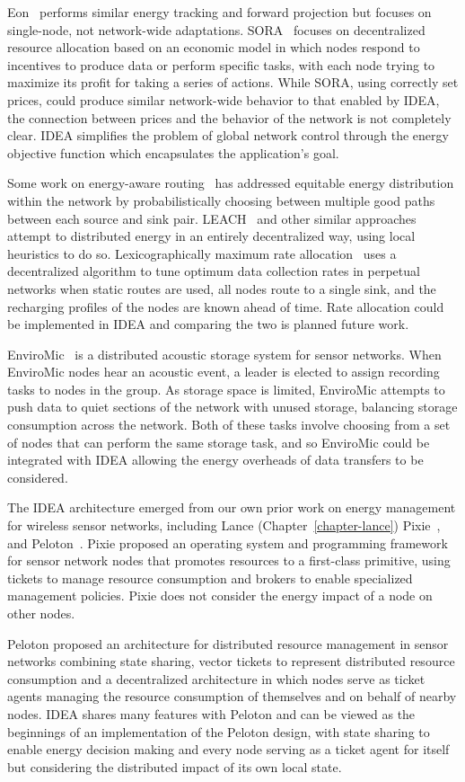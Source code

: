 Eon~\cite{eon-sensys07} performs similar energy tracking and forward
projection but focuses on single-node, not network-wide adaptations.
SORA~\cite{sora-nsdi05} focuses on decentralized resource allocation based on
an economic model in which nodes respond to incentives to produce data or
perform specific tasks, with each node trying to maximize its profit for
taking a series of actions. While SORA, using correctly set prices, could
produce similar network-wide behavior to that enabled by IDEA, the connection
between prices and the behavior of the network is not completely clear. IDEA
simplifies the problem of global network control through the energy objective
function which encapsulates the application's goal.

Some work on energy-aware routing~\cite{ShahRabaey2002,381685} has addressed
equitable energy distribution within the network by probabilistically
choosing between multiple good paths between each source and sink pair.
LEACH~\cite{leach} and other similar approaches attempt to distributed energy
in an entirely decentralized way, using local heuristics to do so.
Lexicographically maximum rate allocation~\cite{fairrate-sensys08} uses a
decentralized algorithm to tune optimum data collection rates in perpetual
networks when static routes are used, all nodes route to a single sink, and
the recharging profiles of the nodes are known ahead of time. Rate allocation
could be implemented in IDEA and comparing the two is planned future work.

EnviroMic~\cite{enviromic} is a distributed acoustic storage system for
sensor networks. When EnviroMic nodes hear an acoustic event, a leader is
elected to assign recording tasks to nodes in the group. As storage space is
limited, EnviroMic attempts to push data to quiet sections of the network
with unused storage, balancing storage consumption across the network. Both
of these tasks involve choosing from a set of nodes that can perform the same
storage task, and so EnviroMic could be integrated with IDEA allowing the
energy overheads of data transfers to be considered.

The IDEA architecture emerged from our own prior work on energy management
for wireless sensor networks, including Lance (Chapter~\ref{chapter-lance})
Pixie~\cite{pixie-sensys08}, and Peloton~\cite{peloton-hotos09}. Pixie
proposed an operating system and programming framework for sensor network
nodes that promotes resources to a first-class primitive, using tickets to
manage resource consumption and brokers to enable specialized management
policies. Pixie does not consider the energy impact of a node on other nodes.

Peloton proposed an architecture for distributed resource management in
sensor networks combining state sharing, vector tickets to represent
distributed resource consumption and a decentralized architecture in which
nodes serve as ticket agents managing the resource consumption of themselves
and on behalf of nearby nodes. IDEA shares many features with Peloton and can
be viewed as the beginnings of an implementation of the Peloton design, with
state sharing to enable energy decision making and every node serving as a
ticket agent for itself but considering the distributed impact of its own
local state.
